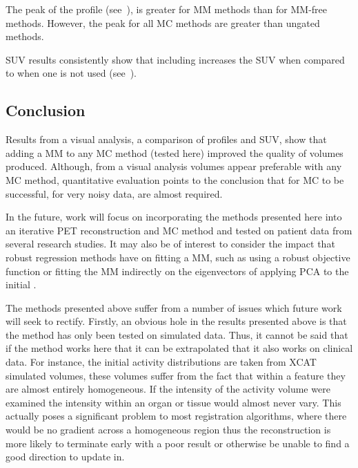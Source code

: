             The peak of the profile (see~), is greater for \gls{MM} methods than for \gls{MM}-free methods. However, the peak for all \gls{MC} methods are greater than ungated methods.
             
            \gls{SUV} results consistently show that including  increases the \gls{SUV} when compared to when one is not used (see~).
        
        \subsection{Conclusion} \label{sec:comparison_of_motion_correction_methods_incorporating_motion_modelling_for_pet/ct_using_a_single_breath_hold_attenuation_map_conclusions}
            Results from a visual analysis, a comparison of profiles and \gls{SUV}, show that adding a \gls{MM} to any \gls{MC} method (tested here) improved the quality of volumes produced. Although, from a visual analysis volumes appear preferable with any \gls{MC} method, quantitative evaluation points to the conclusion that for \gls{MC} to be successful, for very noisy data,  are almost required.
            
            In the future, work will focus on incorporating the methods presented here into an iterative \gls{PET} reconstruction and \gls{MC} method and tested on patient data from several research studies. It may also be of interest to consider the impact that robust regression methods have on fitting a \gls{MM}, such as using a robust objective function or fitting the \gls{MM} indirectly on the eigenvectors of applying \gls{PCA} to the initial .
    
        The methods presented above suffer from a number of issues which future work will seek to rectify. Firstly, an obvious hole in the results presented above is that the method has only been tested on simulated data. Thus, it cannot be said that if the method works here that it can be extrapolated that it also works on clinical data. For instance, the initial activity distributions are taken from \gls{XCAT} simulated volumes, these volumes suffer from the fact that within a feature they are almost entirely homogeneous. If the intensity of the activity volume were examined the intensity within an organ or tissue would almost never vary. This actually poses a significant problem to most registration algorithms, where there would be no gradient across a homogeneous region thus the reconstruction is more likely to terminate early with a poor result or otherwise be unable to find a good direction to update in.
        
